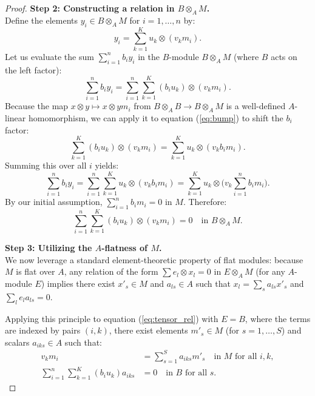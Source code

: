 \begin{proof}
    \medskip\noindent
    \textbf{Step 2: Constructing a relation in $B \otimes_A M$.} \\
    Define the elements $y_i \in B \otimes_A M$ for $i = 1, \dots, n$ by:
    \[
    y_i = \sum_{k=1}^K u_k \otimes (v_k m_i).
    \]
    Let us evaluate the sum $\sum_{i=1}^n b_i y_i$ in the $B$-module $B \otimes_A M$ (where $B$ acts on the left factor):
    \[
    \sum_{i=1}^n b_i y_i = \sum_{i=1}^n \sum_{k=1}^K (b_i u_k) \otimes (v_k m_i).
    \]
    Because the map $x \otimes y \mapsto x \otimes ym_i$ from $B \otimes_A B \to B \otimes_A M$ is a well-defined $A$-linear homomorphism, we can apply it to equation (\ref{eq:bump}) to shift the $b_i$ factor:
    \[
    \sum_{k=1}^K (b_i u_k) \otimes (v_k m_i) = \sum_{k=1}^K u_k \otimes (v_k b_i m_i).
    \]
    Summing this over all $i$ yields:
    \[
    \sum_{i=1}^n b_i y_i = \sum_{i=1}^n \sum_{k=1}^K u_k \otimes (v_k b_i m_i) = \sum_{k=1}^K u_k \otimes \Big( v_k \sum_{i=1}^n b_i m_i \Big).
    \]
    By our initial assumption, $\sum_{i=1}^n b_i m_i = 0$ in $M$. Therefore:
    \begin{equation} \label{eq:tensor_rel}
    \sum_{i=1}^n \sum_{k=1}^K (b_i u_k) \otimes (v_k m_i) = 0 \quad \text{in } B \otimes_A M.
    \end{equation}

    \medskip\noindent
    \textbf{Step 3: Utilizing the $A$-flatness of $M$.} \\
    We now leverage a standard element-theoretic property of flat modules: because $M$ is flat over $A$, any relation of the form $\sum e_l \otimes x_l = 0$ in $E \otimes_A M$ (for any $A$-module $E$) implies there exist $x'_s \in M$ and $a_{ls} \in A$ such that $x_l = \sum_s a_{ls} x'_s$ and $\sum_l e_l a_{ls} = 0$.

    Applying this principle to equation (\ref{eq:tensor_rel}) with $E = B$, where the terms are indexed by pairs $(i, k)$, there exist elements $m'_s \in M$ (for $s = 1, \dots, S$) and scalars $a_{iks} \in A$ such that:
    \begin{align}
    v_k m_i &= \sum_{s=1}^S a_{iks} m'_s \quad \text{in } M \text{ for all } i, k, \label{eq:trivial1} \\
    \sum_{i=1}^n \sum_{k=1}^K (b_i u_k) a_{iks} &= 0 \quad \text{in } B \text{ for all } s. \label{eq:trivial2}
    \end{align}


\end{proof}
